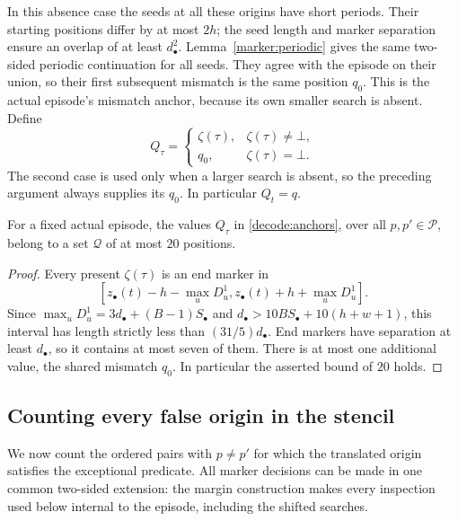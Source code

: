 In this absence case the seeds at all these origins have short
periods.  Their starting positions differ by at most $2h$; the
seed length and marker separation ensure an overlap of at least
$d_\bullet^2$.  Lemma~\ref{marker:periodic} gives the same
two-sided periodic continuation for all seeds.  They agree with
the episode on their union, so their first subsequent mismatch
is the same position $q_0$.  This is the actual episode's mismatch
anchor, because its own smaller search is absent.  Define
\begin{equation}
 Q_\tau=
 \begin{cases}
  \zeta(\tau),&\zeta(\tau)\ne\bot,\\
  q_0,&\zeta(\tau)=\bot.
 \end{cases}
 \label{decode:anchors}
\end{equation}
The second case is used only when a larger search is absent,
so the preceding argument always supplies its $q_0$.
In particular $Q_t=q$.

\begin{lemma}\label{decode:anchor-list}
For a fixed actual episode, the values $Q_\tau$ in
\eqref{decode:anchors}, over all $p,p'\in\mathcal P$, belong to a
set $\mathcal Q$ of at most $20$ positions.
\end{lemma}

\begin{proof}
Every present $\zeta(\tau)$ is an end marker in
\[
 [z_\bullet(t)-h-\max_uD^1_u,
   z_\bullet(t)+h+\max_uD^1_u].
\]
Since $\max_uD^1_u=3d_\bullet+(B-1)S_\bullet$ and
$d_\bullet>10BS_\bullet+10(h+w+1)$, this interval has length
strictly less than $(31/5)d_\bullet$.  End markers have separation
at least $d_\bullet$, so it contains at most seven of them.
There is at most one additional value, the shared mismatch $q_0$.
In particular the asserted bound of $20$ holds.
\end{proof}

\subsection{Counting every false origin in the stencil}

We now count the ordered pairs with $p\ne p'$ for which the
translated origin satisfies the exceptional predicate.  All
marker decisions can be made in one common two-sided extension:
the margin construction makes every inspection used below
internal to the episode, including the shifted searches.

